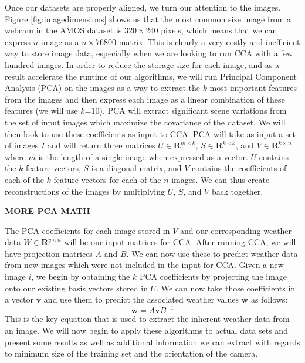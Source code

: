 Once our datasets are properly aligned, we turn our attention to the images. Figure \ref{fig:imagedimensions} shows us that the most common size image from a webcam in the AMOS dataset is $320\times 240$ pixels, which means that we can express $n$ image as a $n\times 76800$ matrix. This is clearly a very costly and inefficient way to store image data, especially when we are looking to run CCA with a few hundred images. In order to reduce the storage size for each image, and as a result accelerate the runtime of our algorithms, we will run Principal Component Analysis (PCA) on the images as a way to extract the $k$ most important features from the images and then express each image as a linear combination of these features (we will use $k$=10). PCA will extract significant scene variations from the set of input images which maximize the covariance of the dataset. We will then look to use these coefficients as input to CCA. PCA will take as input a set of images $I$ and will return three matrices $U\in \mathbf{R}^{m\times k}$, $S\in \mathbf{R}^{k\times k}$, and $V\in \mathbf{R}^{k\times n}$ where $m$ is the length of a single image when expressed as a vector. $U$ contains the $k$ feature vectors, $S$ is a diagonal matrix, and $V$ contains the coefficients of each of the $k$ feature vectors for each of the $n$ images. We can thus create reconstructions of the images by multiplying $U$, $S$, and $V$ back together.

\textbf{MORE PCA MATH}

The PCA coefficients for each image stored in $V$ and our corresponding weather data $W \in \mathbf{R}^{y\times n}$ will be our input matrices for CCA. After running CCA, we will have projection matrices $A$ and $B$. We can now use these to predict weather data from new images which were not included in the input for CCA. Given a new image $i$, we begin by obtaining the $k$ PCA coefficients by projecting the image onto our existing basis vectors stored in $U$. We can now take those coefficients in a vector $\mathbf{v}$ and use them to predict the associated weather values $\mathbf{w}$ as follows:
\begin{equation}\label{eq:predict}\mathbf{w}=A\mathbf{v}B^{-1}\end{equation}
This is the key equation that is used to extract the inherent weather data from an image. We will now begin to apply these algorithms to actual data sets and present some results as well as additional information we can extract with regards to minimum size of the training set and the orientation of the camera.

